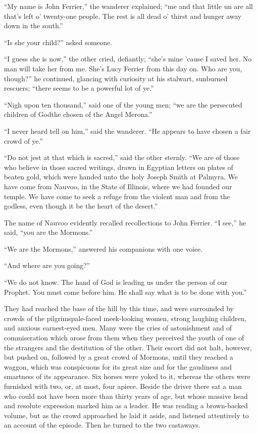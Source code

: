 \documentclass[12pt,english]{book}
\begin{document}
{}``My name is John Ferrier,'' the wanderer explained; {}``me and
that little un are all that's left o' twenty-one people. The rest
is all dead o' thirst and hunger away down in the south.''

{}``Is she your child?'' asked someone.

{}``I guess she is now,'' the other cried, defiantly; {}``she's
mine 'cause I saved her. No man will take her from me. She's Lucy
Ferrier from this day on. Who are you, though?'' he continued, glancing
with curiosity at his stalwart, sunburned rescuers; {}``there seems
to be a powerful lot of ye.''

{}``Nigh upon ten thousand,'' said one of the young men; {}``we
are the persecuted children of God\mdsh{---}the chosen of the Angel
Merona.''

{}``I never heard tell on him,'' said the wanderer. {}``He appears
to have chosen a fair crowd of ye.''

{}``Do not jest at that which is sacred,'' said the other sternly.
{}``We are of those who believe in those sacred writings, drawn in
Egyptian letters on plates of beaten gold, which were handed unto
the holy Joseph Smith at Palmyra. We have come from Nauvoo, in the
State of Illinois, where we had founded our temple. We have come to
seek a refuge from the violent man and from the godless, even though
it be the heart of the desert.''

The name of Nauvoo evidently recalled recollections to John Ferrier.
{}``I see,'' he said, {}``you are the Mormons.''

{}``We are the Mormons,'' answered his companions with one voice.

{}``And where are you going?''

{}``We do not know. The hand of God is leading us under the person
of our Prophet. You must come before him. He shall say what is to
be done with you.''

They had reached the base of the hill by this time, and were surrounded
by crowds of the pilgrims\mdsh{---}pale-faced meek-looking women,
strong laughing children, and anxious earnest-eyed men. Many were
the cries of astonishment and of commiseration which arose from them
when they perceived the youth of one of the strangers and the destitution
of the other. Their escort did not halt, however, but pushed on, followed
by a great crowd of Mormons, until they reached a waggon, which was
conspicuous for its great size and for the gaudiness and smartness
of its appearance. Six horses were yoked to it, whereas the others
were furnished with two, or, at most, four apiece. Beside the driver
there sat a man who could not have been more than thirty years of
age, but whose massive head and resolute expression marked him as
a leader. He was reading a brown-backed volume, but as the crowd approached
he laid it aside, and listened attentively to an account of the episode.
Then he turned to the two castaways.
\end{document}
